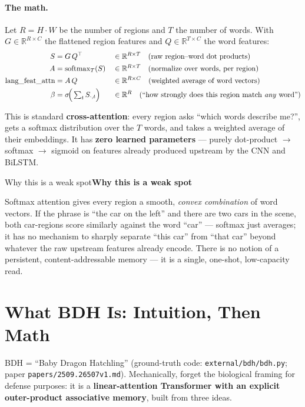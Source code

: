 \documentclass[11pt]{article}
\newlength{\boxinnerwidth}
\newenvironment{keybox}[1][]{%
  \def\tmptitle{#1}%
  \setlength{\boxinnerwidth}{\dimexpr\linewidth-2\fboxsep-2\fboxrule\relax}%
  \begin{lrbox}{\keyboxbin}
  \begin{minipage}{\boxinnerwidth}
  \ifx\tmptitle\empty\else\noindent\textbf{\tmptitle}\par\smallskip\fi
}{%
  \end{minipage}
  \end{lrbox}%
  \par\addvspace{8pt}\noindent\fcolorbox{blue!35!black}{blue!4}{\usebox{\keyboxbin}}\par\addvspace{8pt}%
}
\newcommand{\R}{\mathbb{R}}
\begin{document}
\paragraph{The math.} Let $R = H \cdot W$ be the number of regions and $T$ the number
of words. With $G \in \R^{R\times C}$ the flattened region features and
$Q \in \R^{T \times C}$ the word features:
\begin{align}
  S &= G\,Q^{\top} && \in \R^{R \times T} \quad \text{(raw region--word dot products)}\\
  A &= \operatorname{softmax}_{T}(S) && \in \R^{R \times T} \quad \text{(normalize over words, per region)}\\
  \text{lang\_feat\_attn} &= A\,Q && \in \R^{R \times C} \quad \text{(weighted average of word vectors)}\\
  \beta &= \sigma\!\Big(\textstyle\sum_{t} S_{\cdot,t}\Big) && \in \R^{R} \quad \text{(``how strongly does this region match \emph{any} word'')}
\end{align}

This is standard \textbf{cross-attention}: every region asks ``which words describe
me?'', gets a softmax distribution over the $T$ words, and takes a weighted average
of their embeddings. It has \textbf{zero learned parameters} --- purely
dot-product $\to$ softmax $\to$ sigmoid on features already produced upstream by the
CNN and BiLSTM.

\begin{keybox}[Why this is a weak spot]
Softmax attention gives every region a smooth, \emph{convex combination} of word
vectors. If the phrase is ``the car on the left'' and there are two cars in the
scene, both car-regions score similarly against the word ``car'' --- softmax just
averages; it has no mechanism to sharply separate ``this car'' from ``that car''
beyond whatever the raw upstream features already encode. There is no notion of a
persistent, content-addressable memory --- it is a single, one-shot, low-capacity
read.
\end{keybox}

\section{What BDH Is: Intuition, Then Math}

BDH = ``Baby Dragon Hatchling'' (ground-truth code: \texttt{external/bdh/bdh.py};
paper \texttt{papers/2509.26507v1.md}). Mechanically, forget the biological framing
for defense purposes: it is a \textbf{linear-attention Transformer with an explicit
outer-product associative memory}, built from three ideas.
\end{document}
